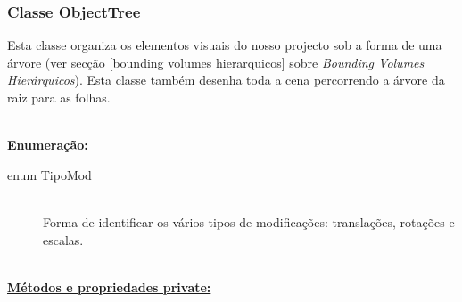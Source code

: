 \documentclass[a5paper,onecolumn, 11pt]{article}
\begin{document}
\clearpage
\subsubsection{Classe ObjectTree} \label{classe objecttree}
Esta classe organiza os elementos visuais do nosso projecto sob a forma de uma árvore (ver secção \ref{bounding volumes hierarquicos} sobre \textit{Bounding Volumes Hierárquicos}). Esta classe também desenha toda a cena percorrendo a árvore da raiz para as folhas.

\hfill \\ \underline{\textbf{Enumeração:}}

\begin{description}
	\item[enum TipoMod] \hfill \\
	Forma de identificar os vários tipos de modificações: translações, rotações e escalas.
\end{description}

\hfill \\ \underline{\textbf{Métodos e propriedades private:}}
\end{document}
